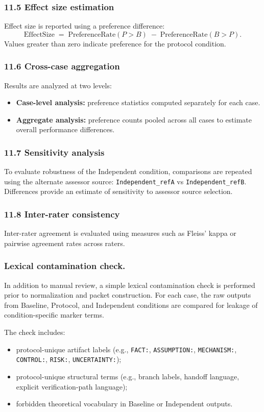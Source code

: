 {\subsubsection*{11.5 Effect size estimation}
Effect size is reported using a preference difference:
\[
\mathrm{EffectSize} \;=\; \mathrm{PreferenceRate}(P>B) \;-\; \mathrm{PreferenceRate}(B>P).
\]
Values greater than zero indicate preference for the protocol condition.

\subsubsection*{11.6 Cross-case aggregation}
Results are analyzed at two levels:
\begin{itemize}
  \item \textbf{Case-level analysis:} preference statistics computed separately for each case.
  \item \textbf{Aggregate analysis:} preference counts pooled across all cases to estimate overall performance differences.
\end{itemize}

\subsubsection*{11.7 Sensitivity analysis}
To evaluate robustness of the Independent condition, comparisons are repeated using the alternate assessor source:
\texttt{Independent\_refA} vs \texttt{Independent\_refB}. Differences provide an estimate of sensitivity to assessor source selection.

\subsubsection*{11.8 Inter-rater consistency}
Inter-rater agreement is evaluated using measures such as Fleiss' kappa or pairwise agreement rates across raters.

\subsubsection*{Lexical contamination check.}
In addition to manual review, a simple lexical contamination check is performed
prior to normalization and packet construction. For each case, the raw outputs
from Baseline, Protocol, and Independent conditions are compared for leakage of
condition-specific marker terms.

The check includes:
\begin{itemize}
  \item protocol-unique artifact labels (e.g., \texttt{FACT:}, \texttt{ASSUMPTION:},
        \texttt{MECHANISM:}, \texttt{CONTROL:}, \texttt{RISK:}, \texttt{UNCERTAINTY:});
  \item protocol-unique structural terms (e.g., branch labels, handoff language,
        explicit verification-path language);
  \item forbidden theoretical vocabulary in Baseline or Independent outputs.
\end{itemize}

}
